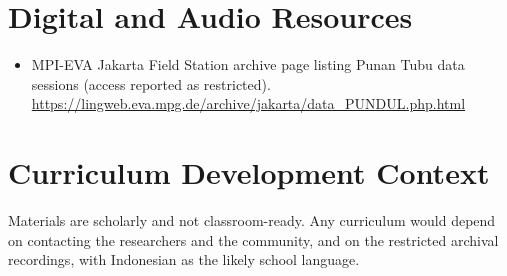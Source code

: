 \documentclass[12pt]{article}
\begin{document}
\section{Digital and Audio Resources}
\begin{itemize}
\item MPI-EVA Jakarta Field Station archive page listing Punan Tubu data sessions (access reported as restricted). \url{https://lingweb.eva.mpg.de/archive/jakarta/data_PUNDUL.php.html}
\end{itemize}

\section{Curriculum Development Context}
Materials are scholarly and not classroom-ready. Any curriculum would depend on contacting the researchers and the community, and on the restricted archival recordings, with Indonesian as the likely school language.
\end{document}
